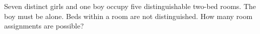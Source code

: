 Seven distinct girls and one boy occupy five distinguishable two-bed rooms. The boy must be alone. Beds within a room are not distinguished. How many room assignments are possible?
